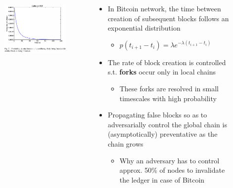 \documentclass{beamer}
\begin{document}
\begin{frame}
\begin{columns}
\begin{column}{0.3\textwidth}
\begin{figure}
				\includegraphics[width=\textwidth]{decker_figures/decker_7.png}
			\end{figure}
		\end{column}

		\begin{column}{0.7\textwidth}
			\begin{itemize}
				\item In Bitcoin network, the time between creation of subsequent blocks follows an exponential distribution
				\begin{itemize}
					\item $p(t_{i+1}-t_i)=\lambda e^{-\lambda\left(t_{i+1}-t_i\right)}$
				\end{itemize}
				\item The rate of block creation is controlled s.t. \textbf{forks} occur only in local chains
				\begin{itemize}
					\item These forks are resolved in small timescales with high probability
				\end{itemize}
				\item Propagating false blocks so as to adversarially control the global chain is (asymptotically) preventative as the chain grows
				\begin{itemize}
					\item Why an adversary has to control approx. 50\% of nodes to invalidate the ledger in case of Bitcoin
				\end{itemize}
			\end{itemize}
		\end{column}
	\end{columns}
\end{frame}
\end{document}
